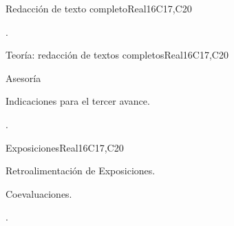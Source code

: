\begin{syllabus}
\begin{unit}{Redacción de texto completo}{}{Real}{16}{C17,C20}
  \begin{learningoutcomes}
   \item .%
  \end{learningoutcomes}
\end{unit}

\begin{unit}{Teoría: redacción de textos completos}{}{Real}{16}{C17,C20}
  \begin{topics}
      \item Asesoría
      \item Indicaciones para el tercer avance.
  \end{topics}

  \begin{learningoutcomes}
   \item .%
  \end{learningoutcomes}
\end{unit}

\begin{unit}{Exposiciones}{}{Real}{16}{C17,C20}
  \begin{topics}
      \item Retroalimentación de Exposiciones.
      \item Coevaluaciones.
  \end{topics}

  \begin{learningoutcomes}
   \item .%
  \end{learningoutcomes}
\end{unit}



\begin{coursebibliography}
\end{coursebibliography}

\end{syllabus}
